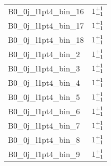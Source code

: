 \begin{tabular}{|l|c|}
B0\_0j\_l1pt4\_bin\_16 & $1^{+1}_{-1}$ \\
B0\_0j\_l1pt4\_bin\_17 & $1^{+1}_{-1}$ \\
B0\_0j\_l1pt4\_bin\_18 & $1^{+1}_{-1}$ \\
B0\_0j\_l1pt4\_bin\_2 & $1^{+1}_{-1}$ \\
B0\_0j\_l1pt4\_bin\_3 & $1^{+1}_{-1}$ \\
B0\_0j\_l1pt4\_bin\_4 & $1^{+1}_{-1}$ \\
B0\_0j\_l1pt4\_bin\_5 & $1^{+1}_{-1}$ \\
B0\_0j\_l1pt4\_bin\_6 & $1^{+1}_{-1}$ \\
B0\_0j\_l1pt4\_bin\_7 & $1^{+1}_{-1}$ \\
B0\_0j\_l1pt4\_bin\_8 & $1^{+1}_{-1}$ \\
B0\_0j\_l1pt4\_bin\_9 & $1^{+1}_{-1}$ \\
\hline
\end{tabular}

